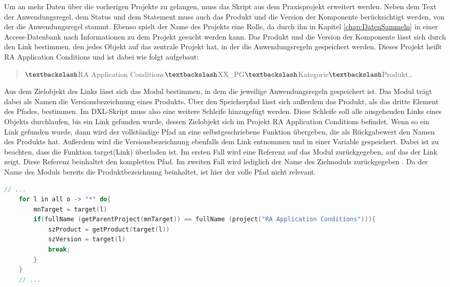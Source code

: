 Um an mehr Daten über die vorherigen Projekte zu gelangen, muss das Skript aus dem Praxisprojekt erweitert werden. Neben dem Text der Anwendungsregel, dem Status und dem Statement
muss auch das Produkt und die Version der Komponente berücksichtigt werden, von der die Anwendungsregel stammt. Ebenso spielt der Name des Projekts eine Rolle,
da durch ihn in Kapitel \ref*{chap:DatenSammeln} in einer Access-Datenbank nach Informationen zu dem Projekt gesucht werden kann. 
Das Produkt und die Version der Komponente lässt sich durch den Link bestimmen, den jedes Objekt auf das zentrale Projekt hat, in der die Anwendungsregeln gespeichert werden.
Dieses Projekt heißt RA Application Conditions und ist dabei wie folgt aufgebaut:

\begin{quotation}
    $\textbackslash$RA Application Conditions$\textbackslash$XX\_PG$\textbackslash$Kategorie$\textbackslash$Produkt\dots
\end{quotation}

Aus dem Zielobjekt des Links lässt sich das Modul bestimmen, in dem die jeweilige Anwendungsregeln gespeichert ist. Das Modul trägt dabei als Namen die Versionsbezeichnung eines Produkts.
Über den Speicherpfad lässt sich außerdem das Produkt, als das dritte Element des Pfades, bestimmen. Im \ac{DXL}-Skript muss also eine weitere Schleife hinzugefügt werden.
Diese Schleife soll alle ausgehenden Links eines Objekts durchlaufen, bis ein Link gefunden wurde, dessen Zielobjekt sich im Projekt RA Application Conditions befindet.
Wenn so ein Link gefunden wurde, dann wird der vollständige Pfad an eine selbstgeschriebene Funktion übergeben, die als Rückgabewert den Namen des Produkts hat.
Außerdem wird die Versionsbezeichnung ebenfalls dem Link entnommen und in einer Variable gespeichert. Dabei ist zu beachten, dass die Funktion target(Link) überladen ist.
Im ersten Fall wird eine Referenz auf das Modul zurückgegeben, auf das der Link zeigt. Diese Referenz beinhaltet den kompletten Pfad. Im zweiten Fall wird lediglich der Name des Zielmoduls 
zurückgegeben \cite[vgl. S.391]{DXL}. Da der Name des Moduls bereits die Produktbezeichnung beinhaltet, ist hier der volle Pfad nicht relevant.

\begin{lstlisting}[language = C++, caption={Produkt- und Versionsbezeichnung bestimmen},captionpos=b, label = lst:getProductVersion, float, floatplacement=H]
    // ...
    for l in all o -> "*" do{
        mnTarget = target(l)
        if(fullName (getParentProject(mnTarget)) == fullName (project("RA Application Conditions"))){
            szProduct = getProduct(target(l)) 
            szVersion = target(l)
            break;
        } 
    }
    // ...
\end{lstlisting}

